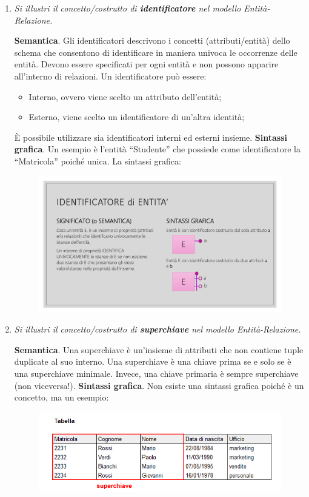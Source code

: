 \documentclass[a4paper]{article}
\newcommand{\dquotes}[1]{``#1''}
\begin{document}
\begin{enumerate}
		
		\item \textcolor{Green4}{\emph{Si illustri il concetto/costrutto di \textbf{identificatore} nel modello Entità-Relazione.}}
		
		\textbf{Semantica}. Gli identificatori descrivono i concetti (attributi/entità) dello schema che consentono di identificare in maniera univoca le occorrenze delle entità. Devono essere specificati per ogni entità e non possono apparire all'interno di relazioni. Un identificatore può essere:
		\begin{itemize}
			\item Interno, ovvero viene scelto un attributo dell'entità;
			\item Esterno, viene scelto un identificatore di un'altra identità;
		\end{itemize}
		È possibile utilizzare sia identificatori interni ed esterni insieme.\newline
		\textbf{Sintassi grafica}. Un esempio è l'entità \dquotes{Studente} che possiede come identificatore la \dquotes{Matricola} poiché unica. La sintassi grafica:
		\begin{figure}[!htp]
			\centering
			\includegraphics[width=.6\textwidth]{img/identificatore_def.pdf}
		\end{figure}
		
		
		\item \textcolor{Green4}{\emph{Si illustri il concetto/costrutto di \textbf{superchiave} nel modello Entità-Relazione.}}
		
		\textbf{Semantica}. Una superchiave è un'insieme di attributi che non contiene tuple duplicate al suo interno. Una superchiave è una chiave prima se e solo se è una superchiave minimale. Invece, una chiave primaria è sempre superchiave (non viceversa!).\newline
		\textbf{Sintassi grafica}. Non esiste una sintassi grafica poiché è un concetto, ma un esempio:
		\begin{figure}[!htp]
			\centering
			\includegraphics[width=\textwidth]{img/superchiave.png}
		\end{figure}
		

\end{enumerate}
\end{document}
